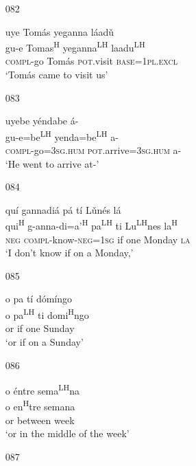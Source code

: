 \begin{itemize}
\item[082]
 
\glll   uye Tom\'{a}s yeganna l\'{a}ad\v{u} \\
gu-e Tomas\textsuperscript{H} yeganna\textsuperscript{LH} laadu\textsuperscript{LH} \\
\textsc{compl}-go Tom\'{a}s \textsc{pot}.visit \textsc{base}=\textsc{1pl.excl} \\
\glt `Tom\'{a}s came to visit us'
 


\item[083]
 
\glll   uyebe y\'{e}ndabe \'{a}-  \\
 gu-e=be\textsuperscript{LH} yenda=be\textsuperscript{LH} a-  \\
\textsc{compl}-go=\textsc{3sg.hum} \textsc{pot}.arrive=\textsc{3sg.hum} a- \\
\glt `He went to arrive at-'
 


\item[084]
 
\glll   qu\'{i} gannadi\'{a} p\'{a} t\'{i} L\v{u}n\'{e}s l\'{a} \\
qui\textsuperscript{H} g-anna-di=a'\textsuperscript{H} pa\textsuperscript{LH} ti Lu\textsuperscript{LH}nes la\textsuperscript{H} \\
\textsc{neg} \textsc{compl}-know-\textsc{neg}=\textsc{1sg} if one Monday \textsc{la} \\
\glt `I don't know if on a Monday,'
 


\item[085]
 
\glll   o pa t\'{i} d\'{o}m\'{i}ngo \\
o pa\textsuperscript{LH} ti domi\textsuperscript{H}ngo  \\
or if one Sunday \\
\glt `or if on a Sunday' 
 


\item[086]
 
\glll   o \'{e}ntre sema\textsuperscript{LH}na \\
o en\textsuperscript{H}tre semana \\
or between week \\
\glt `or in the middle of the week'
 


\item[087]
 

\end{itemize}
